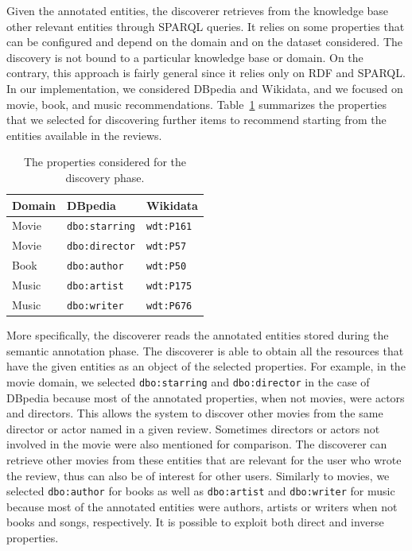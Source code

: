 Given the annotated entities, the discoverer retrieves from the knowledge base other relevant entities through SPARQL queries. It relies on some properties that can be configured and depend on the domain and on the dataset considered. The discovery is not bound to a particular knowledge base or domain. On the contrary, this approach is fairly general since it relies only on RDF and SPARQL. In our implementation, we considered DBpedia and Wikidata, and we focused on movie, book, and music recommendations. Table~\ref{srr:tab:disc} summarizes the properties that we selected for discovering further items to recommend starting from the entities available in the reviews.

\begin{table}
\centering
\begin{tabular}{@{}lll@{}}
\toprule
Domain & DBpedia               & Wikidata          \\ \midrule
Movie  & \texttt{dbo:starring} & \texttt{wdt:P161} \\
Movie  & \texttt{dbo:director} & \texttt{wdt:P57}  \\
Book   & \texttt{dbo:author}   & \texttt{wdt:P50}  \\
Music  & \texttt{dbo:artist}   & \texttt{wdt:P175} \\
Music  & \texttt{dbo:writer}   & \texttt{wdt:P676} \\ \bottomrule
\end{tabular}
\caption[Properties for discovery phase]{The properties considered for the discovery phase.}
\label{srr:tab:disc}
\end{table}

More specifically, the discoverer reads the annotated entities stored during the semantic annotation phase. The discoverer is able to obtain all the resources that have the given entities as an object of the selected properties. For example, in the movie domain, we selected \texttt{dbo:starring} and \texttt{dbo:director} in the case of DBpedia because most of the annotated properties, when not movies, were actors and directors. This allows the system to discover other movies from the same director or actor named in a given review. Sometimes directors or actors not involved in the movie were also mentioned for comparison. The discoverer can retrieve other movies from these entities that are relevant for the user who wrote the review, thus can also be of interest for other users. Similarly to movies, we selected \texttt{dbo:author} for books as well as \texttt{dbo:artist} and \texttt{dbo:writer} for music because most of the annotated entities were authors, artists or writers when not books and songs, respectively. It is possible to exploit both direct and inverse properties.
 
